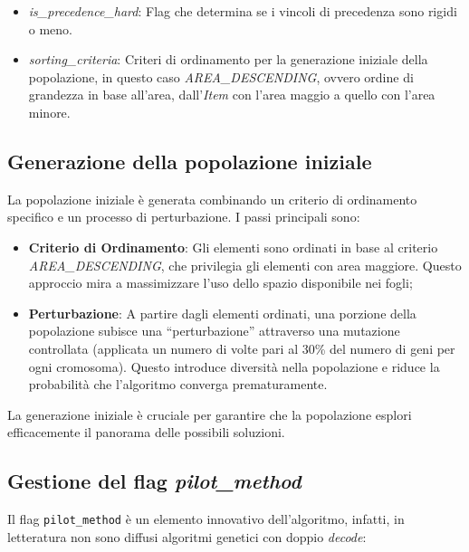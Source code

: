 \begin{itemize}
    \item \emph{is\_precedence\_hard}: Flag che determina se i vincoli di precedenza sono rigidi o meno.
    \item \emph{sorting\_criteria}: Criteri di ordinamento per la generazione iniziale della popolazione, in questo caso \emph{AREA\_DESCENDING}, ovvero ordine di grandezza in base all'area, dall'\emph{Item} con l'area maggio a quello con l'area minore.
\end{itemize}

\subsection{Generazione della popolazione iniziale}

La popolazione iniziale è generata combinando un criterio di ordinamento specifico e un processo di perturbazione. I passi principali sono:

\begin{itemize}
    \item \textbf{Criterio di Ordinamento}: Gli elementi sono ordinati in base al criterio \emph{AREA\_DESCENDING}, che privilegia gli elementi con area maggiore. Questo approccio mira a massimizzare l'uso dello spazio disponibile nei fogli;
    \item \textbf{Perturbazione}: A partire dagli elementi ordinati, una porzione della popolazione subisce una ``perturbazione'' attraverso una mutazione controllata (applicata un numero di volte pari al 30\% del numero di geni per ogni cromosoma). Questo introduce diversità nella popolazione e riduce la probabilità che l'algoritmo converga prematuramente.
\end{itemize}

La generazione iniziale è cruciale per garantire che la popolazione esplori efficacemente il panorama delle possibili soluzioni.

\subsection{Gestione del flag \emph{pilot\_method}}
Il flag \texttt{pilot\_method} è un elemento innovativo dell'algoritmo, infatti, in letteratura non sono diffusi algoritmi genetici con doppio \emph{decode}:

